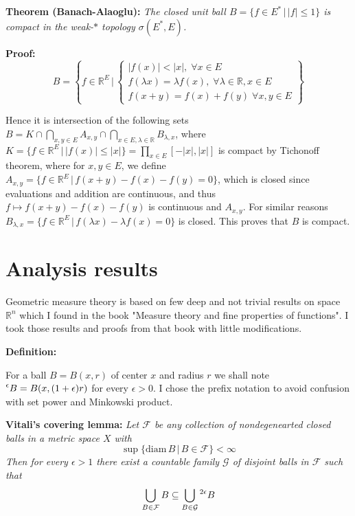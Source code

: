 \documentclass{article}
\begin{document}
\vspace{1ex}
\textbf{Theorem (Banach-Alaoglu):} \textit{The closed unit ball $B=\{f\in E^*\,|\,|
f|\leq 1\}$ is compact in the weak-$*$ topology $\sigma(E^*, E)$.}

\vspace{1ex}
\textbf{Proof:}
\[ B=\left\{f\in\mathbb{R}^E\,|\,
\begin{cases}
    |f(x)|<|x|,\;\forall x\in E\\
    f(\lambda x)=\lambda f(x),\;\forall\lambda\in\mathbb{R}, x\in E\\
    f(x+y)=f(x)+f(y)\;\forall x,y\in E
\end{cases}
\right\} \] 

Hence it is intersection of the following sets $B=K\cap\bigcap_{x,y\in E} A_{x,y}
\cap\bigcap_{x\in E, \lambda\in\mathbb{R}}B_{\lambda,x}$, where $K=\{f\in\mathbb
{R}^E\,|\,|f(x)|\leq|x|\}=\prod_{x\in E}[-|x|, |x|]$ is compact by Tichonoff
theorem, where for $x,y\in E$, we define $A_{x,y}=\{f\in\mathbb{R}^E\,|\,f(x+y)-
f(x)-f(y)=0\}$, which is closed since evaluations and addition are continuous, and
thus $f\mapsto f(x+y)-f(x)-f(y)$ is continuous and $A_{x,y}$. For similar
reasons $B_{\lambda, x}=\{f\in\mathbb{R}^E\,|\,f(\lambda x)-\lambda f(x)=0\}$ is
closed. This proves that $B$ is compact.

\section{Analysis results}

Geometric measure theory is based on few deep and not trivial results on space
$\mathbb{R}^n$ which I found in the book "Measure theory and fine properties
of functions". I took those results and proofs from that book with little
modifications.

\vspace{2ex}
\textbf{Definition:} 

\vspace{2ex}
For a ball $B=B(x, r)$ of center $x$ and radius $r$ we shall note $\prescript{\epsilon}{}B
=B(x, (1+\epsilon)r)$ for every $\epsilon>0$. I chose the prefix notation to
avoid confusion with set power and Minkowski product.

\vspace{1ex}
\textbf{Vitali's covering lemma:} \textit{
Let $\mathcal{F}$ be any collection of nondegenearted closed balls in a metric
space $X$ with
\[ \sup\{\text{diam}\,B\,|\, B\in\mathcal{F}\}<\infty \]
Then for every $\epsilon>1$ there exist a countable family $\mathcal{G}$ of
disjoint balls in $\mathcal{F}$ such that
\[\bigcup_{B\in\mathcal{F}}B\subseteq\bigcup_{B\in\mathcal{G}}\prescript{2\epsilon}{}B\]}
\end{document}
